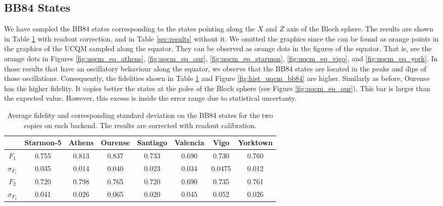 \subsection{BB84 States}

We have sampled the BB84 states corresponding to the states pointing along the $X$ and $Z$ axis of the Bloch sphere. The results are shown in Table \ref{tab:uqcm_results_bb} with readout correction, and in Table \ref{sec:results} without it. We omitted the graphics since the can be found as orange points in the graphics of the UCQM sampled along the equator. They can be observed as orange dots in the figures of the equator. That is, see the orange dots in Figures \ref{fig:uqcm_eq_athens}, \ref{fig:uqcm_eq_our}, \ref{fig:uqcm_eq_starmon}, \ref{fig:uqcm_eq_vigo}, and \ref{fig:uqcm_eq_york}. In those results that have an oscillatory behaviour along the equator, we observe that the BB84 states are located in the peaks and dips of those oscillations. Consequently, the fidelities shown in Table \ref{tab:uqcm_results_bb} and Figure \ref{fig:hist_uqcm_bb84} are higher. Similarly as before, Ourense has the higher fidelity. It copies better the states at the poles of the Bloch sphere (see Figure \ref{fig:uqcm_eq_our}). This bar is larger than the expected value. However, this excess is inside the error range due to statistical uncertanty.

\begin{table}[H]
    \centering
    \begin{tabular}{|c|c|c|c|c|c|c|c|}
    \hline
    \textbf{} & \textbf{Starmon-5} & \textbf{Athens} & \textbf{Ourense} & \textbf{Santiago} & \textbf{Valencia} & \textbf{Vigo} & \textbf{Yorktown} \\ \hline
    $F_1$              & 0.755 & 0.813 & 0.837 & 0.733 & 0.690 & 0.730 & 0.760\\ \hline
    $\sigma_{F_1}$     & 0.035 & 0.014 & 0.040 & 0.023 & 0.034 & 0.0475 & 0.012 \\ \hline
    $F_2$              & 0.720 & 0.798 & 0.765 & 0.720 & 0.690 & 0.735 & 0.761 \\ \hline
    $\sigma_{F_2}$     & 0.041 & 0.026 & 0.065 & 0.020 & 0.045 & 0.052 & 0.026 \\ \hline
    \end{tabular}
    \caption{Average fidelity and corresponding standard deviation on the BB84 states for the two copies on each backend. The results are corrected with readout calibration.}\label{tab:uqcm_results_bb}
\end{table}

